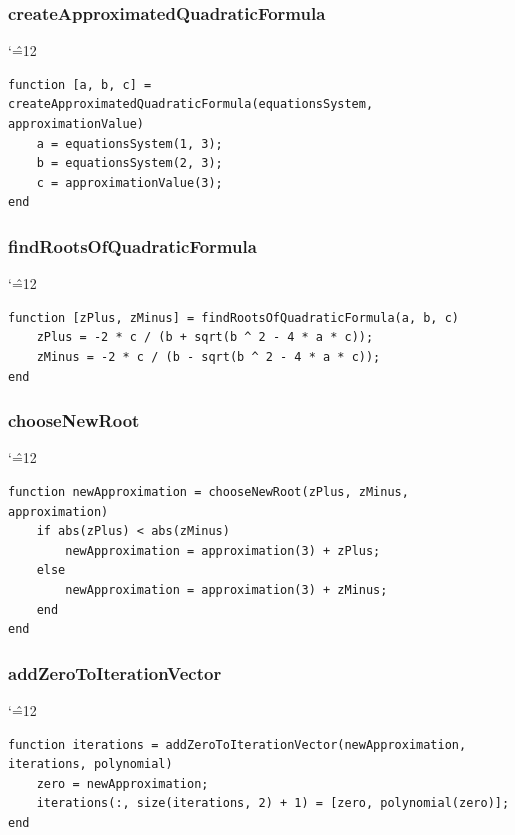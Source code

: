 \documentclass[12pt]{report}
\newenvironment{simplechar}{%
   \catcode`\^=12
}{}
\begin{document}
\newpage
\subsubsection{createApproximatedQuadraticFormula}
\begin{simplechar}
\begin{lstlisting}
function [a, b, c] = createApproximatedQuadraticFormula(equationsSystem, approximationValue)
    a = equationsSystem(1, 3);
    b = equationsSystem(2, 3);
    c = approximationValue(3);
end
\end{lstlisting}
\end{simplechar}

\subsubsection{findRootsOfQuadraticFormula}
\begin{simplechar}
\begin{lstlisting}
function [zPlus, zMinus] = findRootsOfQuadraticFormula(a, b, c)
    zPlus = -2 * c / (b + sqrt(b ^ 2 - 4 * a * c));
    zMinus = -2 * c / (b - sqrt(b ^ 2 - 4 * a * c));
end
\end{lstlisting}
\end{simplechar}

\subsubsection{chooseNewRoot}
\begin{simplechar}
\begin{lstlisting}
function newApproximation = chooseNewRoot(zPlus, zMinus, approximation)
    if abs(zPlus) < abs(zMinus)
        newApproximation = approximation(3) + zPlus;
    else
        newApproximation = approximation(3) + zMinus;
    end
end
\end{lstlisting}
\end{simplechar}

\subsubsection{addZeroToIterationVector}
\begin{simplechar}
\begin{lstlisting}
function iterations = addZeroToIterationVector(newApproximation, iterations, polynomial)
    zero = newApproximation;
    iterations(:, size(iterations, 2) + 1) = [zero, polynomial(zero)];
end
\end{lstlisting}
\end{simplechar}
\end{document}
